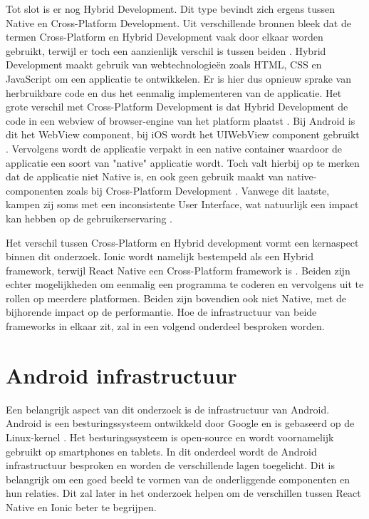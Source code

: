 Tot slot is er nog Hybrid Development. Dit type bevindt zich ergens tussen Native en Cross-Platform Development. Uit verschillende bronnen bleek dat de termen Cross-Platform en Hybrid Development vaak door elkaar worden gebruikt, terwijl er toch een aanzienlijk verschil is tussen beiden \autocite{Bron1, Bron11, Bron12}. Hybrid Development maakt gebruik van webtechnologieën zoals HTML, CSS en JavaScript om een applicatie te ontwikkelen. Er is hier dus opnieuw sprake van herbruikbare code en dus het eenmalig implementeren van de applicatie. Het grote verschil met Cross-Platform Development is dat Hybrid Development de code in een webview of browser-engine van het platform plaatst \autocite{Bron11, Bron1}. Bij Android is dit het WebView component, bij iOS wordt het UIWebView component gebruikt \autocite{Bron4}. Vervolgens wordt de applicatie verpakt in een native container waardoor de applicatie een soort van "native" applicatie wordt. Toch valt hierbij op te merken dat de applicatie niet Native is, en ook geen gebruik maakt van native-componenten zoals bij Cross-Platform Development \autocite{Bron12, Bron6}. Vanwege dit laatste, kampen zij soms met een inconsistente User Interface, wat natuurlijk een impact kan hebben op de gebruikerservaring \autocite{Bron12}.

Het verschil tussen Cross-Platform en Hybrid development vormt een kernaspect binnen dit onderzoek. Ionic wordt namelijk bestempeld als een Hybrid framework, terwijl React Native een Cross-Platform framework is \autocite{Bron4, Bron1}. Beiden zijn echter mogelijkheden om eenmalig een programma te coderen en vervolgens uit te rollen op meerdere platformen. Beiden zijn bovendien ook niet Native, met de bijhorende impact op de performantie. Hoe de infrastructuur van beide frameworks in elkaar zit, zal in een volgend onderdeel besproken worden.


\section{Android infrastructuur}
\label{sec:android-infrastructuur}

Een belangrijk aspect van dit onderzoek is de infrastructuur van Android. Android is een besturingssysteem ontwikkeld door Google en is gebaseerd op de Linux-kernel \autocite{Bron13}. Het besturingssysteem is open-source en wordt voornamelijk gebruikt op smartphones en tablets. In dit onderdeel wordt de Android infrastructuur besproken en worden de verschillende lagen toegelicht. Dit is belangrijk om een goed beeld te vormen van de onderliggende componenten en hun relaties. Dit zal later in het onderzoek helpen om de verschillen tussen React Native en Ionic beter te begrijpen.

